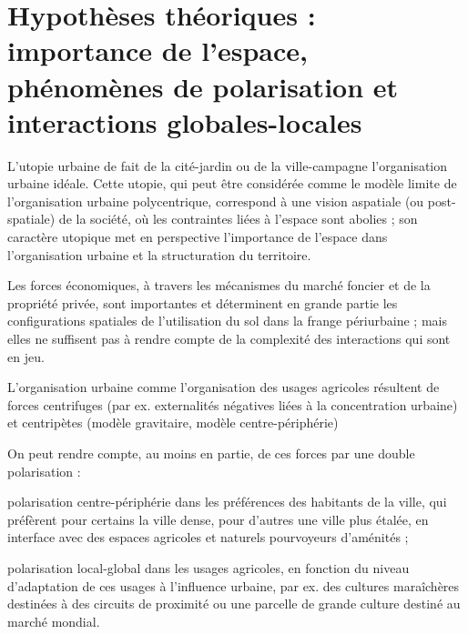 \section{Hypothèses théoriques :
   importance de l'espace, phénomènes de polarisation
   et interactions globales-locales}

\startitemize[n]

\item	L'utopie urbaine de \citet{howard_tomorrow_2003} fait de la cité-jardin ou de la ville-campagne
	l'organisation urbaine idéale.
	Cette utopie, qui peut être considérée comme le modèle limite de l'organisation urbaine polycentrique,
	correspond à une vision aspatiale (ou post-spatiale)
	de la société, où les contraintes liées à l'espace sont abolies ;
	son caractère utopique met en perspective
	l'importance de l'espace dans l'organisation urbaine
	et la structuration du territoire.

\item 	Les forces économiques, à travers les mécanismes
	du marché foncier et de la propriété privée,
	sont importantes et déterminent en grande partie
	les configurations spatiales de l'utilisation du sol
	dans la frange périurbaine ;
	mais elles ne suffisent pas à rendre compte
	de la complexité des interactions qui sont en jeu.

\item	L'organisation urbaine comme l'organisation
	des usages agricoles résultent
	de forces centrifuges (par ex. externalités négatives
	liées à la concentration urbaine) et centripètes
	(modèle gravitaire, modèle centre-périphérie)

	On peut rendre compte, au moins en partie, de ces forces
	par une double polarisation :

	\startitemize[a,packed]

    \item 	polarisation centre-périphérie
     	dans les préférences des habitants de la ville,
		qui préfèrent pour certains la ville dense,
		pour d'autres une ville plus étalée, en interface avec des
		espaces agricoles et naturels pourvoyeurs d'aménités ;

    \item	polarisation local-global dans les usages agricoles,
		en fonction du niveau d'adaptation de ces usages
		à l'influence urbaine, par ex. des cultures maraîchères
		destinées à des circuits de proximité ou une parcelle
		de grande culture destiné au marché mondial.

	\stopitemize

